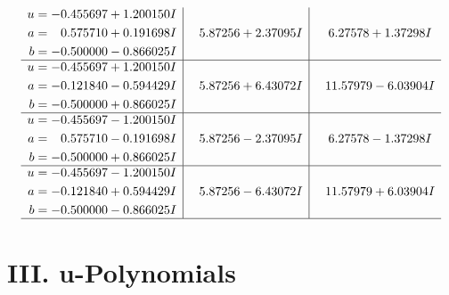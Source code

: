 \documentclass[1p]{elsarticle_modified}
\theoremstyle{definition}
\begin{document}
$$\begin{array}{c|c|c}
\begin{aligned}
u &= -0.455697 + 1.200150 I \\
a &= \phantom{-}0.575710 + 0.191698 I \\
b &= -0.500000 - 0.866025 I\end{aligned}
 & \phantom{-}5.87256 + 2.37095 I & \phantom{-}6.27578 + 1.37298 I \\ \hline\begin{aligned}
u &= -0.455697 + 1.200150 I \\
a &= -0.121840 - 0.594429 I \\
b &= -0.500000 + 0.866025 I\end{aligned}
 & \phantom{-}5.87256 + 6.43072 I & \phantom{-}11.57979 - 6.03904 I \\ \hline\begin{aligned}
u &= -0.455697 - 1.200150 I \\
a &= \phantom{-}0.575710 - 0.191698 I \\
b &= -0.500000 + 0.866025 I\end{aligned}
 & \phantom{-}5.87256 - 2.37095 I & \phantom{-}6.27578 - 1.37298 I \\ \hline\begin{aligned}
u &= -0.455697 - 1.200150 I \\
a &= -0.121840 + 0.594429 I \\
b &= -0.500000 - 0.866025 I\end{aligned}
 & \phantom{-}5.87256 - 6.43072 I & \phantom{-}11.57979 + 6.03904 I\\
 \hline 
 \end{array}$$\newpage
\newpage\renewcommand{\arraystretch}{1}
\centering \section*{ III. u-Polynomials}
\end{document}
